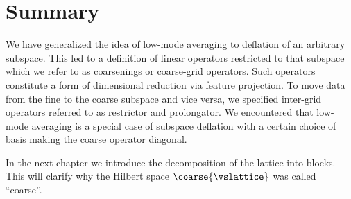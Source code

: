 \section{Summary}
\label{sec:sd:summary}

We have generalized the idea of low-mode averaging to deflation of an arbitrary subspace.
This led to a definition of linear operators restricted to that subspace which we refer to as coarsenings or coarse-grid operators.
Such operators constitute a form of dimensional reduction via feature projection.
To move data from the fine to the coarse subspace and vice versa, we specified inter-grid operators referred to as restrictor and prolongator.
We encountered that low-mode averaging is a special case of subspace deflation with a certain choice of basis making the coarse operator diagonal.

In the next chapter we introduce the decomposition of the lattice into blocks.
This will clarify why the Hilbert space $\coarse{\vslattice}$ was called ``coarse''.


